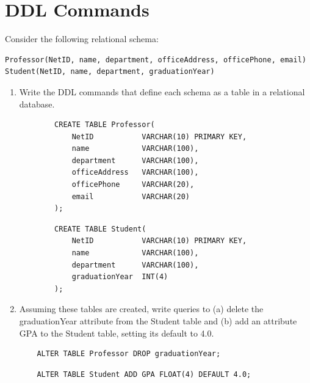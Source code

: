 \documentclass[paper=a4, fontsize=11pt]{scrartcl}
\numberwithin{equation}{section}		%
\numberwithin{figure}{section}			%
\numberwithin{table}{section}				%
\begin{document}
\section{DDL Commands}
Consider the following relational schema:
\begin{lstlisting}
Professor(NetID, name, department, officeAddress, officePhone, email) 
Student(NetID, name, department, graduationYear)
\end{lstlisting}
\begin{enumerate}
	\item Write the DDL commands that define each schema as a table in a relational database.\\
    \begin{lstlisting}
    	CREATE TABLE Professor(
    		NetID           VARCHAR(10) PRIMARY KEY,
        	name            VARCHAR(100),
        	department      VARCHAR(100),
        	officeAddress   VARCHAR(100),
    		officePhone     VARCHAR(20),
        	email           VARCHAR(20)
    	);
    \end{lstlisting}
    
    \begin{lstlisting}
    	CREATE TABLE Student(
    		NetID           VARCHAR(10) PRIMARY KEY,
        	name            VARCHAR(100),
        	department      VARCHAR(100),
    		graduationYear  INT(4)
    	);
    \end{lstlisting}
    
    \item Assuming these tables are created, write queries to (a) delete the graduationYear attribute from the Student table and (b) add an attribute GPA to the Student table, setting its default to 4.0.\\
    \begin{lstlisting}
    ALTER TABLE Professor DROP graduationYear;
    \end{lstlisting}
    
    \begin{lstlisting}
    ALTER TABLE Student ADD GPA FLOAT(4) DEFAULT 4.0;
    \end{lstlisting}
\end{enumerate}


\end{document}
